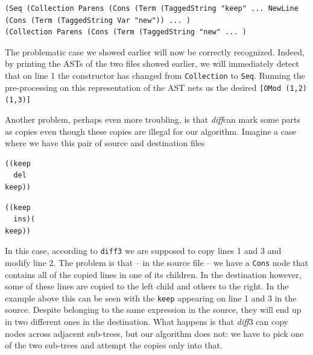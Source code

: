 \documentclass[11pt, titlepage]{article}
\newcommand{\toHaskell}[1]{\texttt{#1}\xspace}
\newcommand{\toClojure}[1]{\texttt{#1}\xspace}
\newcommand{\diff}{\emph{diff}}
\begin{document}
\vspace{.6em}

\begin{minipage}{0.95\textwidth}
\begin{verbatim}
(Seq (Collection Parens (Cons (Term (TaggedString "keep" ... NewLine
(Cons (Term (TaggedString Var "new")) ... )
(Collection Parens (Cons (Term (TaggedString "new" ... )
\end{verbatim}
\end{minipage}
\vspace{.6em}

The problematic case we showed earlier will now be correctly recognized. Indeed, by printing the ASTs of the two files showed earlier, we will immediately detect that on line 1 the constructor has changed from \toHaskell{Collection} to \toHaskell{Seq}. Running the pre-processing on this representation of the AST nets us the desired \toHaskell{[OMod (1,2) (1,3)]}


Another problem, perhaps even more troubling, is that \diff can mark some parts as copies even though these copies are illegal for our algorithm. 
Imagine a case where we have this pair of source and destination files

\vspace{.6em}
\begin{minipage}{0.45\textwidth}
\begin{verbatim}
((keep
  del
keep))
\end{verbatim}
\end{minipage}
\begin{minipage}{0.45\textwidth}
\begin{verbatim}
((keep
  ins)(
keep))
\end{verbatim}
\end{minipage}
\vspace{.6em}

In this case, according to \texttt{diff3} we are supposed to copy lines 1 and 3 and modify line 2. The problem is that -- in the source file -- we have a \toHaskell{Cons} node 
that contains all of the copied lines in one of its children. In the destination however, some of these lines are copied to the left child and others to the right. 
In the example above this can be seen with the \toClojure{keep} appearing on line 1 and 3 in the source. Despite belonging to the same expression in the source, they will end up in two different ones in the destination.
What happens is that \diff3 can copy nodes across adjacent sub-trees, but our algorithm does not: we have to pick one of the two sub-trees and attempt the copies only into that.
\end{document}
